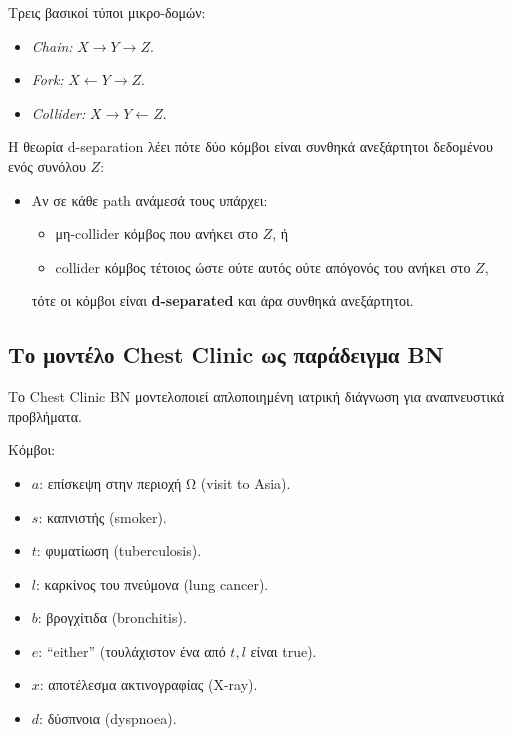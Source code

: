 \documentclass[a4paper,11pt]{article}
\begin{document}
Τρεις βασικοί τύποι μικρο-δομών:

\begin{itemize}
  \item \emph{Chain:} $X \to Y \to Z$.
  \item \emph{Fork:} $X \leftarrow Y \to Z$.
  \item \emph{Collider:} $X \to Y \leftarrow Z$.
\end{itemize}

Η θεωρία d-separation λέει πότε δύο κόμβοι είναι συνθηκά ανεξάρτητοι
δεδομένου ενός συνόλου $Z$:

\begin{itemize}
  \item Αν σε κάθε path ανάμεσά τους υπάρχει:
        \begin{itemize}
          \item μη-collider κόμβος που ανήκει στο $Z$, ή
          \item collider κόμβος τέτοιος ώστε ούτε αυτός ούτε απόγονός του
                ανήκει στο $Z$,
        \end{itemize}
        τότε οι κόμβοι είναι \textbf{d-separated} και άρα συνθηκά ανεξάρτητοι.
\end{itemize}

\subsection{Το μοντέλο Chest Clinic ως παράδειγμα BN}

Το Chest Clinic BN μοντελοποιεί απλοποιημένη ιατρική διάγνωση
για αναπνευστικά προβλήματα.

Κόμβοι:

\begin{itemize}
  \item $a$: επίσκεψη στην περιοχή Ω (visit to Asia).
  \item $s$: καπνιστής (smoker).
  \item $t$: φυματίωση (tuberculosis).
  \item $l$: καρκίνος του πνεύμονα (lung cancer).
  \item $b$: βρογχίτιδα (bronchitis).
  \item $e$: ``either'' (τουλάχιστον ένα από $t,l$ είναι true).
  \item $x$: αποτέλεσμα ακτινογραφίας (X-ray).
  \item $d$: δύσπνοια (dyspnoea).
\end{itemize}
\end{document}

